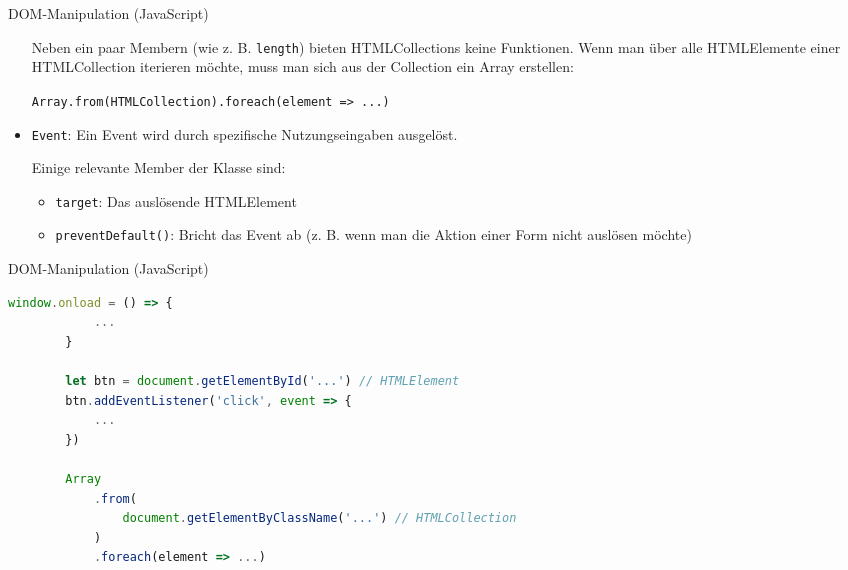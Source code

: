 \begin{defi}{DOM-Manipulation (JavaScript)}
\begin{itemize}
              Neben ein paar Membern (wie z. B. \texttt{length}) bieten HTMLCollections keine Funktionen.
              Wenn man über alle HTMLElemente einer HTMLCollection iterieren möchte, muss man sich aus der Collection ein Array erstellen:

              \texttt{Array.from(HTMLCollection).foreach(element => {...})}
        \item \texttt{Event}: Ein Event wird durch spezifische Nutzungseingaben ausgelöst.

              Einige relevante Member der Klasse sind:
              \begin{itemize}
                  \item \texttt{target}: Das auslösende HTMLElement
                  \item \texttt{preventDefault()}: Bricht das Event ab (z. B. wenn man die Aktion einer Form nicht auslösen möchte)
              \end{itemize}
    \end{itemize}
\end{defi}

\begin{example}{DOM-Manipulation (JavaScript)}
    \begin{lstlisting}[language=JavaScript]
        window.onload = () => {
            ...
        }

        let btn = document.getElementById('...') // HTMLElement
        btn.addEventListener('click', event => {
            ...
        })

        Array
            .from(
                document.getElementByClassName('...') // HTMLCollection
            )
            .foreach(element => ...)
    \end{lstlisting}
\end{example}